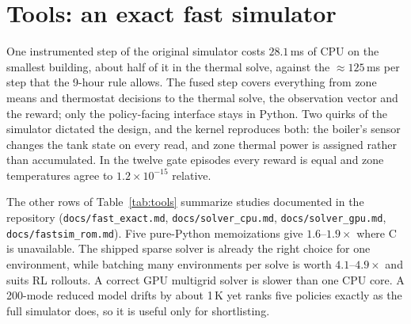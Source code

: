 \documentclass{article}
\newcommand{\e}[1]{\times10^{-#1}}
\begin{document}
\section{Tools: an exact fast simulator}
\label{app:tools}



One instrumented step of the original simulator costs $28.1$\,ms of CPU on the smallest
building, about half of it in the thermal solve, against the $\approx\!125$\,ms per step that the
9-hour rule allows. The fused step covers everything from zone means and thermostat decisions to
the thermal solve, the observation vector and the reward; only the policy-facing interface stays
in Python. Two quirks of the simulator dictated the design, and the kernel reproduces both: the
boiler's sensor changes the tank state on every read, and zone thermal power is assigned rather
than accumulated. In the twelve gate episodes every reward is equal and zone temperatures agree
to $1.2\e{15}$ relative.

The other rows of Table~\ref{tab:tools} summarize studies documented in the repository
(\texttt{docs/fast\_exact.md}, \texttt{docs/solver\_cpu.md}, \texttt{docs/solver\_gpu.md},
\texttt{docs/fastsim\_rom.md}). Five pure-Python memoizations give $1.6$--$1.9\times$ where C is
unavailable. The shipped sparse solver is already the right choice for one environment, while
batching many environments per solve is worth $4.1$--$4.9\times$ and suits RL rollouts. A
correct GPU multigrid solver is slower than one CPU core. A 200-mode reduced model drifts by
about 1\,K yet ranks five policies exactly as the full simulator does, so it is useful only for
shortlisting.
\end{document}
